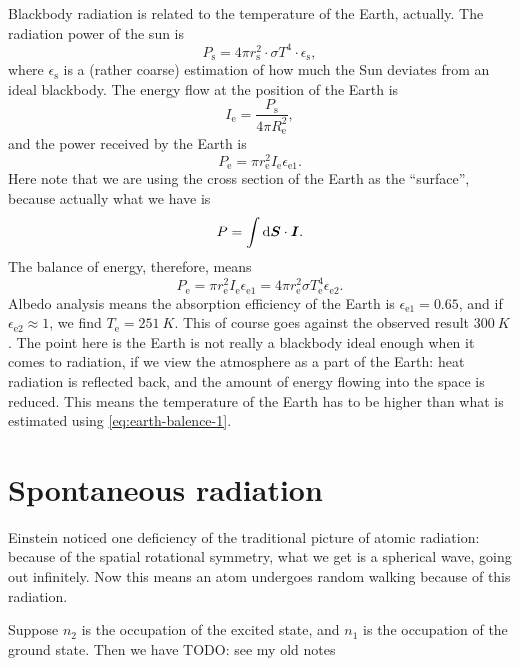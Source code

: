 \documentclass[hyperref, a4paper]{article}
\begin{document}
Blackbody radiation is related to the temperature of the Earth, actually. 
The radiation power of the sun is 
\begin{equation}
    P_\text{s} = 4\pi r_{\text{s}}^2 \cdot \sigma T^4 \cdot \epsilon_{\text{s}}, 
\end{equation}
where $\epsilon_{\text{s}}$ is a (rather coarse) estimation 
of how much the Sun deviates from an ideal blackbody.
The energy flow at the position of the Earth is 
\begin{equation}
    I_{\text{e}} = \frac{P_{\text{s}}}{4 \pi R_{\text{e}}^2},
\end{equation}
and the power received by the Earth is 
\begin{equation}
    P_{\text{e}} = \pi r_{\text{e}}^2 I_{\text{e}} \epsilon_{\text{e} 1}.
\end{equation}
Here note that we are using the cross section of the Earth 
as the ``surface'', 
because actually what we have is 
\[
    P = \int \dd{\vb*{S}} \cdot \vb*{I}.
\]
The balance of energy, therefore, means 
\begin{equation}
    P_{\text{e}} = \pi r_{\text{e}}^2 I_{\text{e}} \epsilon_{\text{e} 1}
    = 4 \pi r_{\text{e}}^2 \sigma T_{\text{e}}^4 \epsilon_{\text{e} 2}.
    \label{eq:earth-balence-1}
\end{equation}
Albedo analysis means the absorption efficiency of the Earth is $\epsilon_{\text{e} 1} = 0.65$,
and if $\epsilon_{\text{e} 2} \approx 1$, 
we find $T_{\text{e}} = \SI{251}{K}$.
This of course goes against the observed result $\SI{300}{K}$.
The point here is the Earth is not really a blackbody ideal enough when it comes to radiation,
if we view the atmosphere as a part of the Earth:
heat radiation is reflected back,
and the amount of energy flowing into the space is reduced. 
This means the temperature of the Earth has to be higher than what is estimated 
using \eqref{eq:earth-balence-1}.

\section{Spontaneous radiation}

Einstein noticed one deficiency of the traditional picture of atomic radiation:
because of the spatial rotational symmetry, 
what we get is a spherical wave,
going out infinitely. 
Now this means an atom undergoes random walking because of this radiation.

Suppose $n_2$ is the occupation of the excited state, 
and $n_1$ is the occupation of the ground state. 
Then we have 
TODO: see my old notes 
\end{document}
